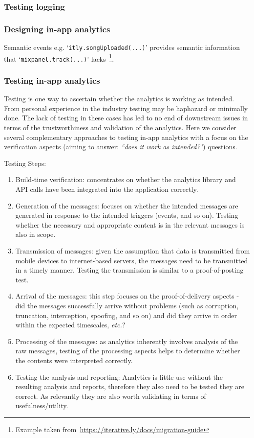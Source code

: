 \subsubsection{Testing logging}



\subsubsection{Designing in-app analytics}

Semantic events e.g. `\texttt{itly.songUploaded(...)}' provides semantic information that `\texttt{mixpanel.track(...)}' lacks~\footnote{Example taken from~\url{https://iterative.ly/docs/migration-guide}}.

\subsubsection{Testing in-app analytics}
Testing is one way to ascertain whether the analytics is working as intended. From personal experience in the industry testing may be haphazard or minimally done. The lack of testing in these cases has led to no end of downstream issues in terms of the trustworthiness and validation of the analytics. Here we consider several complementary approaches to testing in-app analytics with a focus on the verification aspects (aiming to answer: \emph{``does it work as intended?"}) questions.

Testing Steps:
\begin{enumerate}
    \item Build-time verification: concentrates on whether the analytics library and API calls have been integrated into the application correctly.
    \item Generation of the messages: focuses on whether the intended messages are generated in response to the intended triggers (events, and so on). Testing whether the necessary and appropriate content is in the relevant messages is also in scope. 
    \item Transmission of messages: given the assumption that data is transmitted from mobile devices to internet-based servers, the messages need to be transmitted in a timely manner. Testing the transmission is similar to a proof-of-posting test. 
    \item Arrival of the messages: this step focuses on the proof-of-delivery aspects - did the messages successfully arrive without problems (such as corruption, truncation, interception, spoofing, and so on) and did they arrive in order within the expected timescales, \emph{etc.}? 
    \item Processing of the messages: as analytics inherently involves analysis of the raw messages, testing of the processing aspects helps to determine whether the contents were interpreted correctly. 
    \item Testing the analysis and reporting: Analytics is little use without the resulting analysis and reports, therefore they also need to be tested they are correct. As relevantly they are also worth validating in terms of usefulness/utility. 
\end{enumerate}


